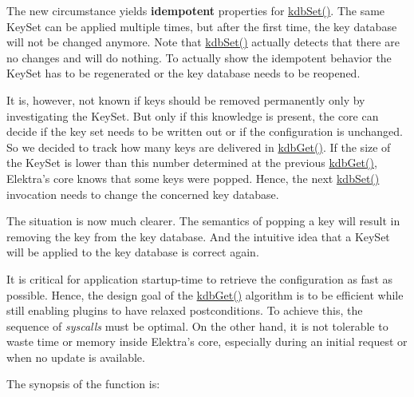 The new circumstance yields {\bfseries{idempotent}} properties for {\ttfamily \mbox{\hyperlink{group__kdb_ga11436b058408f83d303ca5e996832bcf}{kdb\+Set()}}}. The same {\ttfamily Key\+Set} can be applied multiple times, but after the first time, the key database will not be changed anymore. Note that {\ttfamily \mbox{\hyperlink{group__kdb_ga11436b058408f83d303ca5e996832bcf}{kdb\+Set()}}} actually detects that there are no changes and will do nothing. To actually show the idempotent behavior the Key\+Set has to be regenerated or the key database needs to be reopened.

It is, however, not known if keys should be removed permanently only by investigating the {\ttfamily Key\+Set}. But only if this knowledge is present, the core can decide if the key set needs to be written out or if the configuration is unchanged. So we decided to track how many keys are delivered in {\ttfamily \mbox{\hyperlink{group__kdb_ga28e385fd9cb7ccfe0b2f1ed2f62453a1}{kdb\+Get()}}}. If the size of the {\ttfamily Key\+Set} is lower than this number determined at the previous {\ttfamily \mbox{\hyperlink{group__kdb_ga28e385fd9cb7ccfe0b2f1ed2f62453a1}{kdb\+Get()}}}, Elektra’s core knows that some keys were popped. Hence, the next {\ttfamily \mbox{\hyperlink{group__kdb_ga11436b058408f83d303ca5e996832bcf}{kdb\+Set()}}} invocation needs to change the concerned key database.

The situation is now much clearer. The semantics of popping a key will result in removing the key from the key database. And the intuitive idea that a {\ttfamily Key\+Set} will be applied to the key database is correct again.

It is critical for application startup-\/time to retrieve the configuration as fast as possible. Hence, the design goal of the {\ttfamily \mbox{\hyperlink{group__kdb_ga28e385fd9cb7ccfe0b2f1ed2f62453a1}{kdb\+Get()}}} algorithm is to be efficient while still enabling plugins to have relaxed postconditions. To achieve this, the sequence of {\itshape syscalls} must be optimal. On the other hand, it is not tolerable to waste time or memory inside Elektra’s core, especially during an initial request or when no update is available.

The synopsis of the function is\+:


\begin{DoxyCode}{0}
\end{DoxyCode}


